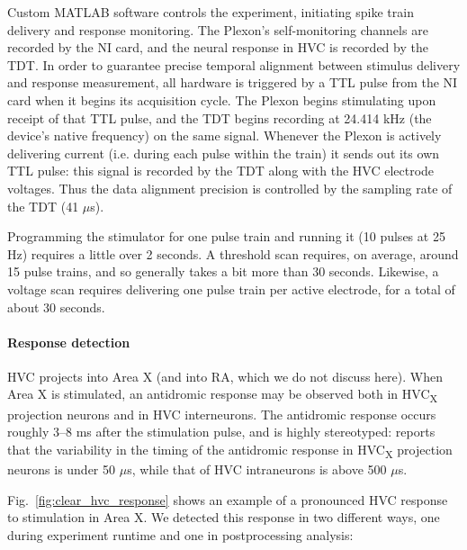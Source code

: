 \documentclass[10pt,letterpaper]{article}
\newcommand\fig[1]{Fig.~\ref{#1}}
\renewcommand{\subsubsection}[1]{\paragraph{#1}}
\begin{document}
Custom MATLAB software controls the experiment, initiating spike train
delivery and response monitoring.  The Plexon's self-monitoring
channels are recorded by the NI card, and the neural response in HVC
is recorded by the TDT.  In order to guarantee precise temporal
alignment between stimulus delivery and response measurement, all
hardware is triggered by a TTL pulse from the NI card when it begins
its acquisition cycle.  The Plexon begins stimulating upon receipt of
that TTL pulse, and the TDT begins recording at 24.414 kHz (the
device's native frequency) on the same signal.  Whenever the Plexon is
actively delivering current (i.e. during each pulse within the train)
it sends out its own TTL pulse: this signal is recorded by the TDT
along with the HVC electrode voltages.  Thus the data alignment
precision is controlled by the sampling rate of the TDT (41 $\mu$s).

Programming the stimulator for one pulse train and running it (10 pulses at 25 Hz) requires a little over 2 seconds. A threshold scan requires, on average, around 15 pulse trains, and so generally takes a bit more than 30 seconds. Likewise, a voltage scan requires delivering one pulse train per active electrode, for a total of about 30 seconds.

\subsubsection{Response detection}
\label{sec:responsedetection}

HVC projects into Area X (and into RA, which we do not discuss here).
When Area X is stimulated, an antidromic response may be observed both
in HVC\textsubscript{X} projection neurons and in HVC interneurons.
The antidromic response occurs roughly 3--8 ms after the stimulation
pulse, and is highly stereotyped: \cite{Fee2004mechanisms} reports
that the variability in the timing of the antidromic response in
HVC\textsubscript{X} projection neurons is under 50 $\mu$s, while that
of HVC intraneurons is above 500 $\mu$s.

\fig{fig:clear_hvc_response} shows an example of a pronounced HVC
response to stimulation in Area X.  We detected this response in two different ways, one during experiment runtime and one in postprocessing analysis:
\end{document}
